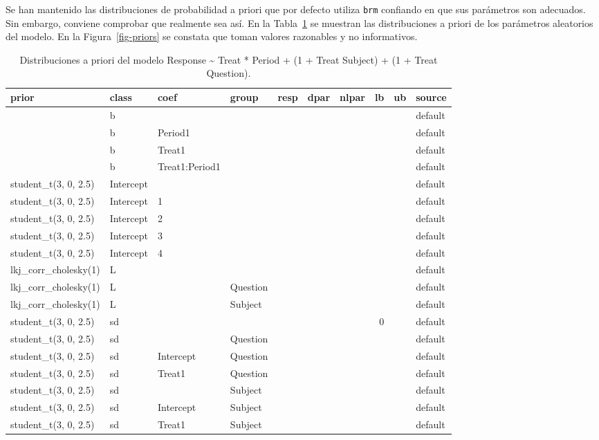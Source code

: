 \documentclass[
  12pt,
  a4paper,
  extrafontsizes,
  onecolumn,
  openright,
  table]{memoir}
\begin{document}
Se han mantenido las distribuciones de probabilidad a priori que por
defecto utiliza \texttt{brm} confiando en que sus parámetros son
adecuados. Sin embargo, conviene comprobar que realmente sea así. En la
Tabla~\ref{tbl-priors} se muestran las distribuciones a priori de los
parámetros aleatorios del modelo. En la Figura~\ref{fig-priors} se
constata que toman valores razonables y no informativos.

\tiny

\hypertarget{tbl-priors}{}
\begin{longtable}{llllrrrrrl}
\caption{\label{tbl-priors}Distribuciones a priori del modelo Response \textasciitilde{} Treat *
Period + (1 + Treat \textbar{} Subject) + (1 + Treat \textbar{}
Question). }\tabularnewline

\toprule
prior & class & coef & group & resp & dpar & nlpar & lb & ub & source \\ 
\midrule
 & b &  &  &  &  &  &  &  & default \\ 
 & b & Period1 &  &  &  &  &  &  & default \\ 
 & b & Treat1 &  &  &  &  &  &  & default \\ 
 & b & Treat1:Period1 &  &  &  &  &  &  & default \\ 
student\_t(3, 0, 2.5) & Intercept &  &  &  &  &  &  &  & default \\ 
student\_t(3, 0, 2.5) & Intercept & 1 &  &  &  &  &  &  & default \\ 
student\_t(3, 0, 2.5) & Intercept & 2 &  &  &  &  &  &  & default \\ 
student\_t(3, 0, 2.5) & Intercept & 3 &  &  &  &  &  &  & default \\ 
student\_t(3, 0, 2.5) & Intercept & 4 &  &  &  &  &  &  & default \\ 
lkj\_corr\_cholesky(1) & L &  &  &  &  &  &  &  & default \\ 
lkj\_corr\_cholesky(1) & L &  & Question &  &  &  &  &  & default \\ 
lkj\_corr\_cholesky(1) & L &  & Subject &  &  &  &  &  & default \\ 
student\_t(3, 0, 2.5) & sd &  &  &  &  &  & 0 &  & default \\ 
student\_t(3, 0, 2.5) & sd &  & Question &  &  &  &  &  & default \\ 
student\_t(3, 0, 2.5) & sd & Intercept & Question &  &  &  &  &  & default \\ 
student\_t(3, 0, 2.5) & sd & Treat1 & Question &  &  &  &  &  & default \\ 
student\_t(3, 0, 2.5) & sd &  & Subject &  &  &  &  &  & default \\ 
student\_t(3, 0, 2.5) & sd & Intercept & Subject &  &  &  &  &  & default \\ 
student\_t(3, 0, 2.5) & sd & Treat1 & Subject &  &  &  &  &  & default \\ 
\bottomrule
\end{longtable}
\end{document}
